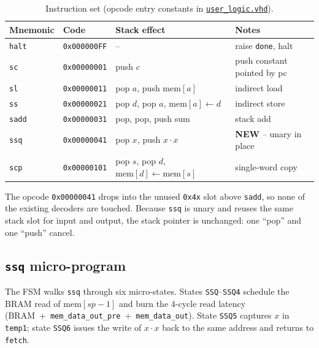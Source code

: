 \documentclass[11pt,letterpaper]{article}
\begin{document}
\begin{table}[H]
    \centering
    \caption{Instruction set (opcode entry constants in
             \href{run:../stackprocessor_101/rtl/user_logic.vhd}{\texttt{user\_logic.vhd}}).}
    \label{tab:isa}
    \small
    \begin{tabular}{llll}
        \toprule
        \textbf{Mnemonic} & \textbf{Code} & \textbf{Stack effect} & \textbf{Notes} \\
        \midrule
        \texttt{halt} & \texttt{0x000000FF} & --                                            & raise \texttt{done}, halt \\
        \texttt{sc}   & \texttt{0x00000001} & push \(c\)                                    & push constant pointed by pc \\
        \texttt{sl}   & \texttt{0x00000011} & pop \(a\), push \(\mathrm{mem}[a]\)           & indirect load \\
        \texttt{ss}   & \texttt{0x00000021} & pop \(d\), pop \(a\), \(\mathrm{mem}[a]\!\leftarrow\!d\) & indirect store \\
        \texttt{sadd} & \texttt{0x00000031} & pop, pop, push sum                            & stack add \\
        \texttt{ssq}  & \texttt{0x00000041} & pop \(x\), push \(x\cdot x\)                  & \textbf{NEW} -- unary in place \\
        \texttt{scp}  & \texttt{0x00000101} & pop \(s\), pop \(d\), \(\mathrm{mem}[d]\!\leftarrow\!\mathrm{mem}[s]\) & single-word copy \\
        \bottomrule
    \end{tabular}
\end{table}

The opcode \texttt{0x00000041} drops into the unused \texttt{0x4x}
slot above \texttt{sadd}, so none of the existing decoders are touched.
Because \texttt{ssq} is unary and reuses the same stack slot for input
and output, the stack pointer is unchanged: one ``pop'' and one
``push'' cancel.

\subsection{\texttt{ssq} micro-program}

The FSM walks \texttt{ssq} through six micro-states.  States
\texttt{SSQ}--\texttt{SSQ4} schedule the BRAM read of
\(\mathrm{mem}[\mathit{sp}-1]\) and burn the 4-cycle read latency
(BRAM~+~\texttt{mem\_data\_out\_pre}~+~\texttt{mem\_data\_out}).  State
\texttt{SSQ5} captures \(x\) in \texttt{temp1}; state \texttt{SSQ6}
issues the write of \(x\cdot x\) back to the same address and returns
to \texttt{fetch}.
\end{document}
